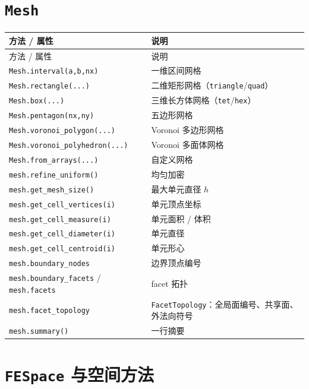 \documentclass[UTF8,11pt,oneside]{ctexbook}
\theoremstyle{definition}
\theoremstyle{plain}
\newcommand{\code}[1]{\texttt{#1}}
\begin{document}
\section{\code{Mesh}}

\begingroup\small
\begin{longtable}{@{}L{5.0cm}L{9.4cm}@{}}
\toprule
方法 / 属性 & 说明 \\
\midrule
\endfirsthead
\toprule
方法 / 属性 & 说明 \\
\midrule
\endhead
\code{Mesh.interval(a,\allowbreak b,\allowbreak nx)} & 一维区间网格 \\
\code{Mesh.rectangle(...)} & 二维矩形网格（\code{triangle}/\allowbreak\code{quad}） \\
\code{Mesh.box(...)} & 三维长方体网格（\code{tet}/\allowbreak\code{hex}） \\
\code{Mesh.pentagon(nx,\allowbreak ny)} & 五边形网格 \\
\code{Mesh.voronoi\_\allowbreak polygon(...)} & Voronoi 多边形网格 \\
\code{Mesh.voronoi\_\allowbreak polyhedron(...)} & Voronoi 多面体网格 \\
\code{Mesh.from\_\allowbreak arrays(...)} & 自定义网格 \\
\code{mesh.refine\_\allowbreak uniform()} & 均匀加密 \\
\code{mesh.get\_\allowbreak mesh\_\allowbreak size()} & 最大单元直径 $h$ \\
\code{mesh.get\_\allowbreak cell\_\allowbreak vertices(i)} & 单元顶点坐标 \\
\code{mesh.get\_\allowbreak cell\_\allowbreak measure(i)} & 单元面积 / 体积 \\
\code{mesh.get\_\allowbreak cell\_\allowbreak diameter(i)} & 单元直径 \\
\code{mesh.get\_\allowbreak cell\_\allowbreak centroid(i)} & 单元形心 \\
\code{mesh.boundary\_\allowbreak nodes} & 边界顶点编号 \\
\code{mesh.boundary\_\allowbreak facets} / \code{mesh.facets} & facet 拓扑 \\
\code{mesh.facet\_\allowbreak topology} & \code{FacetTopology}：全局面编号、共享面、外法向符号 \\
\code{mesh.summary()} & 一行摘要 \\
\bottomrule
\end{longtable}
\endgroup

\section{\code{FESpace} 与空间方法}
\end{document}
